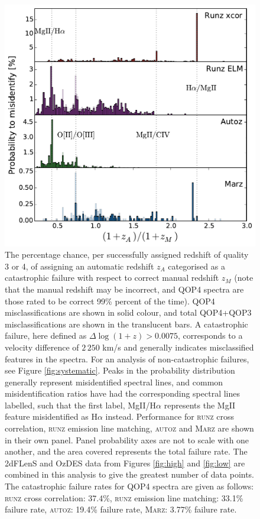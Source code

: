 \documentclass[5p]{elsarticle}
\newcommand{\runz}{\textsc{runz}}
\newcommand{\autoz}{\textsc{autoz}}
\newcommand{\marz}{\textsc{Marz}}
\begin{document}
\begin{figure}[h]
\centering
\includegraphics[width=\columnwidth]{errorRateqop.pdf}
\caption{The percentage chance, per successfully assigned redshift of quality 3 or 4, of assigning an automatic redshift $z_A$ categorised as a catastrophic failure with respect to correct manual redshift $z_M$ (note that the manual redshift may be incorrect, and QOP4 spectra are those rated to be correct 99\% percent of the time). QOP4 misclassifications are shown in solid colour, and total QOP4+QOP3 misclassifications are shown in the translucent bars. A catastrophic failure, here defined as $\Delta \log(1 + z) > 0.0075$, corresponds to a velocity difference of $2\,250$ km/s and generally indicates misclassified features in the spectra. For an analysis of non-catastrophic failures, see Figure \ref{fig:systematic}. Peaks in the probability distribution generally represent misidentified spectral lines, and common misidentification ratios have had the corresponding spectral lines labelled, such that the first label, MgII/H$\alpha$ represents the MgII feature misidentified as H$\alpha$ instead. Performance for \runz{} cross correlation, \runz{} emission line matching, \autoz{} and \marz{} are shown in their own panel. Panel probability axes are not to scale with one another, and the area covered represents the total failure rate. The 2dFLenS and OzDES data from Figures \ref{fig:high} and \ref{fig:low} are combined in this analysis to give the greatest number of data points. The catastrophic failure rates for QOP4 spectra are given as follows: \runz{} cross correlation: 37.4\%, \runz{} emission line matching: 33.1\% failure rate, \autoz{}: 19.4\% failure rate, \marz{}: 3.77\% failure rate.}
\label{fig:f4}
\end{figure}
\end{document}
